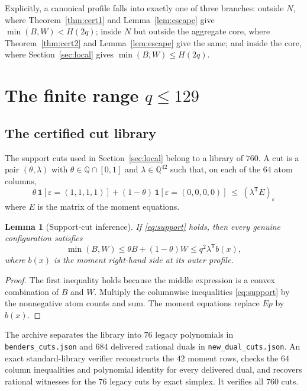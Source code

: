 \documentclass[11pt]{amsart}
\newtheorem{lemma}[theorem]{Lemma}
\theoremstyle{definition}
\theoremstyle{remark}
\newcommand{\Q}{\mathbb{Q}}
\newcommand{\bs}{\discretionary{}{}{}}
\begin{document}
Explicitly, a canonical profile falls into exactly one of three branches: outside $N$, where Theorem~\ref{thm:cert1} and Lemma~\ref{lem:escape} give $\min(B,W)<H(2q)$; inside $N$ but outside the aggregate core, where Theorem~\ref{thm:cert2} and Lemma~\ref{lem:escape} give the same; and inside the core, where Section~\ref{sec:local} gives $\min(B,W)\le H(2q)$.

\section{The finite range \texorpdfstring{$q\le129$}{q <= 129}}\label{sec:ladder}

\subsection{The certified cut library}

The support cuts used in Section~\ref{sec:local} belong to a library of
$760$.  A cut is a pair $(\theta,\lambda)$ with
$\theta\in\Q\cap[0,1]$ and $\lambda\in\Q^{42}$ such that, on each of the
$64$ atom columns,
\begin{equation}\label{eq:support}
\theta\,\mathbf 1[\varepsilon=(1,1,1,1)]
+(1-\theta)\,\mathbf 1[\varepsilon=(0,0,0,0)]
\ \le\ (\lambda^{\mathsf T}E)_{\varepsilon}
\end{equation}
where $E$ is the matrix of the moment equations.

\begin{lemma}[Support-cut inference]\label{lem:cutsound}
If \eqref{eq:support} holds, then every genuine configuration satisfies
\[
\min(B,W)\le\theta B+(1-\theta)W
\le q^2\lambda^{\mathsf T}b(x),
\]
where $b(x)$ is the moment right-hand side at its outer profile.
\end{lemma}

\begin{proof}
The first inequality holds because the middle expression is a convex
combination of $B$ and $W$.  Multiply the columnwise inequalities
\eqref{eq:support} by the nonnegative atom counts and sum.  The moment
equations replace $Ep$ by $b(x)$.
\end{proof}

The archive separates the library into $76$ legacy polynomials in
\texttt{benders\_\bs{}cuts.json} and $684$ delivered rational duals in
\texttt{new\_\bs{}dual\_\bs{}cuts.json}.  An exact standard-library verifier
reconstructs the $42$ moment rows, checks the $64$ column inequalities and
polynomial identity for every delivered dual, and recovers rational
witnesses for the $76$ legacy cuts by exact simplex.  It verifies all
$760$ cuts.
\end{document}
